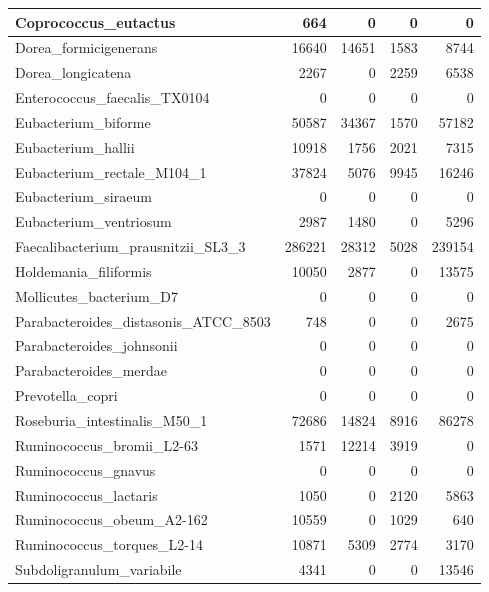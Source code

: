\documentclass[12pt,a4paper]{article}
\begin{document}
\begin{table}[ht]
\begin{center}
\begin{tabular}{|l*{4}{|r}|}
Coprococcus\_eutactus & 664 & 0 & 0 & 0 \\ \hline
Dorea\_formicigenerans & 16640 & 14651 & 1583 & 8744 \\ \hline
Dorea\_longicatena & 2267 & 0 & 2259 & 6538 \\ \hline
Enterococcus\_faecalis\_TX0104 & 0 & 0 & 0 & 0 \\ \hline
Eubacterium\_biforme & 50587 & 34367 & 1570 & 57182 \\ \hline
Eubacterium\_hallii & 10918 & 1756 & 2021 & 7315 \\ \hline
Eubacterium\_rectale\_M104\_1 & 37824 & 5076 & 9945 & 16246 \\ \hline
Eubacterium\_siraeum & 0 & 0 & 0 & 0 \\ \hline
Eubacterium\_ventriosum & 2987 & 1480 & 0 & 5296 \\ \hline
Faecalibacterium\_prausnitzii\_SL3\_3 & 286221 & 28312 & 5028 & 239154 \\ \hline
Holdemania\_filiformis & 10050 & 2877 & 0 & 13575 \\ \hline
Mollicutes\_bacterium\_D7 & 0 & 0 & 0 & 0 \\ \hline
Parabacteroides\_distasonis\_ATCC\_8503 & 748 & 0 & 0 & 2675 \\ \hline
Parabacteroides\_johnsonii & 0 & 0 & 0 & 0 \\ \hline
Parabacteroides\_merdae & 0 & 0 & 0 & 0 \\ \hline
Prevotella\_copri & 0 & 0 & 0 & 0 \\ \hline
Roseburia\_intestinalis\_M50\_1 & 72686 & 14824 & 8916 & 86278 \\ \hline
Ruminococcus\_bromii\_L2-63 & 1571 & 12214 & 3919 & 0 \\ \hline
Ruminococcus\_gnavus & 0 & 0 & 0 & 0 \\ \hline
Ruminococcus\_lactaris & 1050 & 0 & 2120 & 5863 \\ \hline
Ruminococcus\_obeum\_A2-162 & 10559 & 0 & 1029 & 640 \\ \hline
Ruminococcus\_torques\_L2-14 & 10871 & 5309 & 2774 & 3170 \\ \hline
Subdoligranulum\_variabile & 4341 & 0 & 0 & 13546 \\ \hline
\end{tabular}
\end{center}
\end{table}
\end{document}
